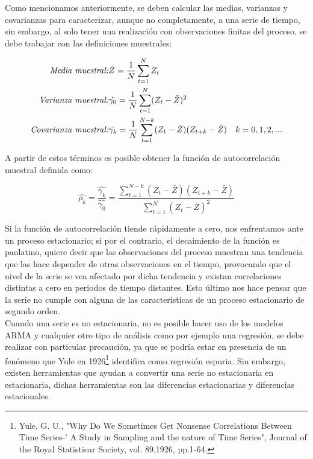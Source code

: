 Como mencionamos anteriormente, se deben calcular las medias, varianzas y covarianzas para caracterizar, aunque no completamente, a una serie de tiempo, sin embargo, al solo tener una realización con observaciones finitas del proceso, se debe trabajar con las definiciones muestrales:\newline


\begin{eqnarray}
        \mbox{\emph{Media muestral:}} & \bar{Z} =\frac{1}{N} \sum_{t=1}^{N}{Z_t} &  \nonumber \\ 
        \mbox{\emph{Varianza muestral:}}  & \hat{\gamma_0}=\frac{1}{N} \sum_{t=1}^{N}(Z_t- \bar{Z} )^2 & \\ 
        \mbox{\emph{Covarianza muestral:}} & \hat{\gamma_k}=\frac{1}{N} \sum_{t=1}^{N-k}(Z_t-\bar{Z})(Z_{t+k}-\bar{Z})  & k=0,1,2,...  \nonumber
\end{eqnarray} 

A partir de estos términos es posible obtener la función de autocorrelación muestral definida como:

\begin{equation}
\hat{\rho_k}= \frac{\hat{\gamma_k}}{\hat{\gamma_0}}=\frac{\sum_{t=1}^{N-k}(Z_t-\bar{Z})(Z_{t+k}-\bar{Z})}{\sum_{t=1}^{N}(Z_t- \bar{Z} )^2}
\end{equation}




Si la función de autocorrelación tiende rápidamente a cero, nos enfrentamos ante un proceso estacionario; si por el contrario, el decaimiento de la función es paulatino, quiere decir que las observaciones del proceso muestran una tendencia que las hace depender de  otras observaciones en el tiempo, provocando que el nivel de la serie se vea afectado por dicha tendencia y existan correlaciones distintas a cero en periodos de tiempo distantes. Esto último nos hace pensar que la serie no cumple con alguna de las características de un proceso estacionario de segundo orden. \\


Cuando una serie es no estacionaria, no es posible hacer uso de los modelos ARMA y cualquier otro tipo de análisis como por ejemplo una regresión, se debe realizar con particular precaución, ya que se podría estar en presencia de un fenómeno que Yule en 1926\footnote{Yule, G. U., "Why Do We Sometimes Get Nonsense Correlations Between Time Series-' A Study in Sampling and the nature of Time Series", Journal of the Royal Statisticar Society, vol. 89,1926, pp.1-64.} identifica como regresión espuria. Sin embargo, existen herramientas que ayudan a convertir una serie no estacionaria en estacionaria, dichas herramientas son las diferencias estacionarias y diferencias estacionales.\\

